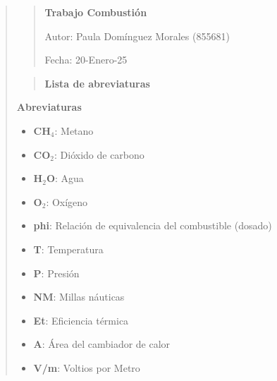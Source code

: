 \documentclass[11pt, a4paper]{article}
\begin{document}
\begin{quote}
\begin{center}
\begin{adjustwidth}{-1.7cm}{-1cm}
\begin{quote}
\begin{center}
\begin{spacing}{1.2}
{\fontsize{18}{20}\selectfont\textbf{Trabajo Combustión}}

\vspace{2cm} %

Autor: Paula Domínguez Morales (855681)

Fecha: 20-Enero-25
\end{spacing} 
\end{center}
\end{quote}
\end{adjustwidth}



\begin{adjustwidth}{-1.7cm}{-1cm}


\begin{quote}
\setlength{\parskip}{1pt} %
\vspace*{0.5cm} %
\begin{center}
{\fontsize{18}{20}\selectfont\textbf{Lista de abreviaturas}}
\end{center}
\end{quote}
\vspace*{1cm} %

{\fontsize{14}{20}\selectfont\textbf{Abreviaturas}}
\vspace{0.2cm} %
{

\begin{itemize}
    \item \textbf{CH$_4$}: Metano
    \item \textbf{CO$_2$}: Dióxido de carbono
    \item \textbf{H$_2$O}: Agua
    \item \textbf{O$_2$}: Oxígeno
    \item \textbf{phi}: Relación de equivalencia del combustible (dosado)
    \item \textbf{T}: Temperatura
    \item \textbf{P}: Presión
    \item \textbf{NM}: Millas náuticas
    \item \textbf{Et}: Eficiencia térmica
    \item \textbf{A}: Área del cambiador de calor
    \item \textbf{V/m}: Voltios por Metro
\end{itemize}
}

\vspace{1cm} %




\end{adjustwidth}
\end{center}
\end{quote}
\end{document}

